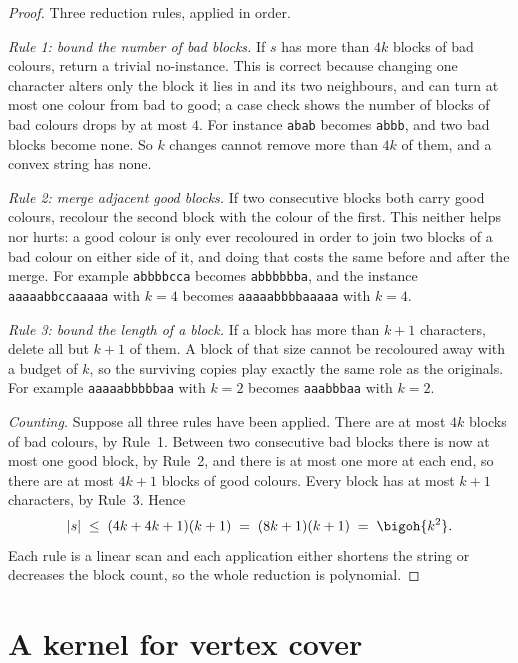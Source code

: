 \begin{proof}
Three reduction rules, applied in order.

\emph{Rule 1: bound the number of bad blocks.} If $s$ has more than $4k$ blocks
of bad colours, return a trivial no-instance. This is correct because changing
one character alters only the block it lies in and its two neighbours, and can
turn at most one colour from bad to good; a case check shows the number of
blocks of bad colours drops by at most $4$. For instance \texttt{abab} becomes
\texttt{abbb}, and two bad blocks become none. So $k$ changes cannot remove more
than $4k$ of them, and a convex string has none.

\emph{Rule 2: merge adjacent good blocks.} If two consecutive blocks both carry
good colours, recolour the second block with the colour of the first. This
neither helps nor hurts: a good colour is only ever recoloured in order to join
two blocks of a bad colour on either side of it, and doing that costs the same
before and after the merge. For example \texttt{abbbbcca} becomes
\texttt{abbbbbba}, and the instance \texttt{aaaaabbccaaaaa} with $k = 4$ becomes
\texttt{aaaaabbbbaaaaa} with $k = 4$.

\emph{Rule 3: bound the length of a block.} If a block has more than $k+1$
characters, delete all but $k+1$ of them. A block of that size cannot be
recoloured away with a budget of $k$, so the surviving copies play exactly the
same role as the originals. For example \texttt{aaaaabbbbbaa} with $k = 2$
becomes \texttt{aaabbbaa} with $k = 2$.

\emph{Counting.} Suppose all three rules have been applied. There are at most
$4k$ blocks of bad colours, by Rule~1. Between two consecutive bad blocks there
is now at most one good block, by Rule~2, and there is at most one more at each
end, so there are at most $4k+1$ blocks of good colours. Every block has at most
$k+1$ characters, by Rule~3. Hence
\[ |s| \;\le\; (4k + 4k + 1)(k+1) \;=\; (8k+1)(k+1) \;=\; \bigoh{k^2}. \]
Each rule is a linear scan and each application either shortens the string or
decreases the block count, so the whole reduction is polynomial.
\end{proof}

\section{A kernel for vertex cover}
\label{sec:fpt-vc-kernel}

